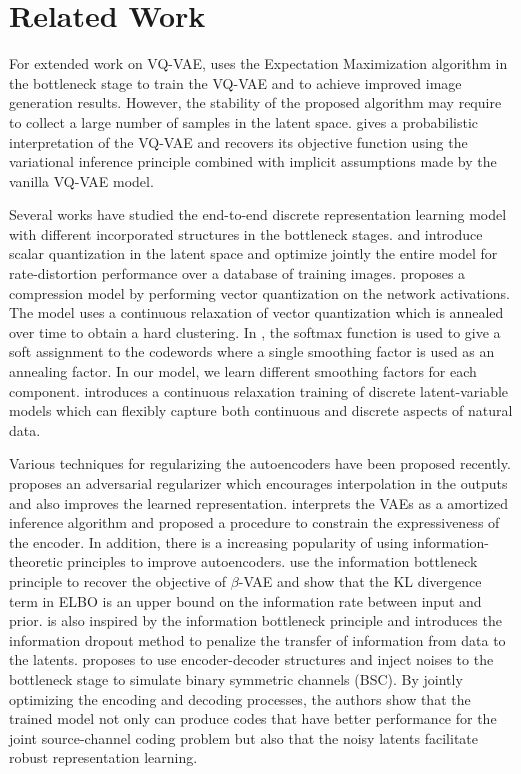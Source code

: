 \documentclass[letterpaper]{article} %
\begin{document}
\section{Related Work}
\label{Background}
For extended work on VQ-VAE, \cite{roy:18} uses the Expectation Maximization algorithm in the bottleneck stage to train the VQ-VAE and to achieve improved image generation results. However, the stability of the proposed algorithm may require to collect a large number of samples in the latent space. \cite{Henter2018} gives a probabilistic interpretation of the VQ-VAE and recovers its objective function using the variational inference principle combined with implicit assumptions made by the vanilla VQ-VAE model.

Several works have studied the end-to-end discrete representation learning model with different incorporated structures in the bottleneck stages. \cite{theis:17:iclr} and \cite{Balle:17:iclr}  introduce scalar quantization in the latent space and optimize jointly the entire model for rate-distortion performance over a database of training images. \cite{agustsson:17:nips} proposes a compression model by performing vector quantization on the network activations. The model uses a continuous relaxation of vector quantization which is annealed over time to obtain a hard clustering. In \cite{agustsson:17:nips}, the softmax function is used to give a soft assignment to the codewords where a single smoothing factor is used as an annealing factor. In our model, we learn different smoothing factors for each component. \cite{sonderbypoole2017} introduces a continuous relaxation training of discrete latent-variable models which can flexibly capture both continuous and discrete aspects of natural data.

Various techniques for regularizing the autoencoders have been proposed recently. \cite{DBLP:journals/corr/abs-1807-07543} proposes an adversarial regularizer which encourages interpolation in the outputs and also improves the learned representation. \cite{NIPS2018_7692} interprets the VAEs as a amortized inference algorithm and proposed a procedure to constrain the expressiveness of the encoder. In addition, there is a increasing popularity of using information-theoretic principles to improve autoencoders. \cite{alemi:17:iclr}\cite{pmlr-v80-alemi18a} use the information bottleneck principle \cite{tishby:15:itw} to recover the objective of $\beta$-VAE and show that the KL divergence term in ELBO is an upper bound on the information rate between input and prior. \cite{8253482} is also inspired by the information bottleneck principle and  introduces the information dropout method to penalize the transfer of information from data to the latents. \cite{DBLP:journals/corr/abs-1811-07557} proposes to use encoder-decoder structures and inject noises to the bottleneck stage to simulate binary symmetric channels (BSC). By jointly optimizing the encoding and decoding processes, the authors show that the trained model not only can produce codes that have better performance for the joint source-channel coding problem but also that the noisy latents facilitate robust representation learning.
\end{document}
